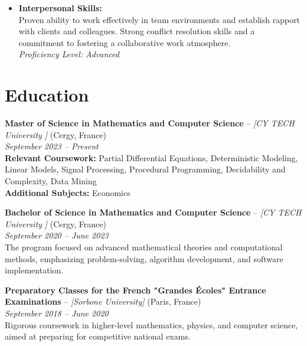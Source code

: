 \documentclass[10pt, letterpaper]{article}
\begin{document}
\begin{itemize}[label=\textbullet]
            \item \textbf{Interpersonal Skills:} \\
            Proven ability to work effectively in team environments and establish rapport with clients and colleagues. Strong conflict resolution skills and a commitment to fostering a collaborative work atmosphere. \\
            \textit{Proficiency Level: Advanced}
        
        \end{itemize}
    \section*{Education}

        \noindent
        \textbf{Master of Science in Mathematics and Computer Science} – \textit{[CY TECH University ]} (Cergy, France) \\
        \textit{September 2023 – Present} \\
        \textbf{Relevant Coursework:} Partial Differential Equations, Deterministic Modeling, Linear Models, Signal Processing, Procedural Programming, Decidability and Complexity, Data Mining \\
        \textbf{Additional Subjects:} Economics
        
        \vspace{10pt}
        
        \noindent
        \textbf{Bachelor of Science in Mathematics and Computer Science} – \textit{[CY TECH University ]} (Cergy, France) \\
        \textit{September 2020 – June 2023} \\
        The program focused on advanced mathematical theories and computational methods, emphasizing problem-solving, algorithm development, and software implementation.
        
        \vspace{10pt}
        
        \noindent
        \textbf{Preparatory Classes for the French "Grandes Écoles" Entrance Examinations} – \textit{[Sorbone University]} (Paris, France) \\
        \textit{September 2018 – June 2020} \\
        Rigorous coursework in higher-level mathematics, physics, and computer science, aimed at preparing for competitive national exams.
        
        \vspace{10pt}
        
\end{document}
